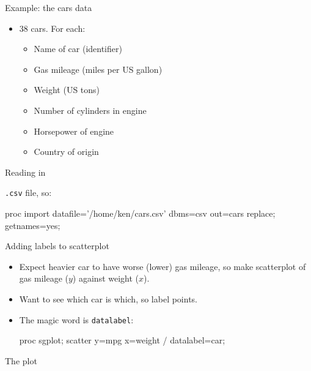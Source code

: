 \documentclass[unknownkeysallowed]{beamer}\usepackage[]{graphicx}\usepackage[]{color}
\begin{document}
\begin{frame}[fragile]{Example: the cars data}
  
  \begin{itemize}
  \item 38 cars. For each: 
    \begin{itemize}
    \item Name of car (identifier)
    \item Gas mileage (miles per US gallon)
    \item Weight (US tons)
    \item Number of cylinders in engine
    \item Horsepower of engine
    \item Country of origin
    \end{itemize}
  \end{itemize}
  
\end{frame}

\begin{frame}[fragile]{Reading in}
  
  \texttt{.csv} file, so:
  
    \begin{Datastep}
proc import 
  datafile='/home/ken/cars.csv'
  dbms=csv
  out=cars
  replace;
  getnames=yes;
    \end{Datastep}
  
  
\end{frame}

\begin{frame}[fragile]{Adding labels to scatterplot}
  
  \begin{itemize}
  \item Expect heavier car to have worse (lower) gas mileage, so make
    scatterplot of gas mileage ($y$) against weight ($x$).
  \item Want to see which car is which, so label points. 
  \item The magic word is \texttt{datalabel}:
    
    \begin{Sascode}[store=muggins]
proc sgplot;
  scatter y=mpg x=weight / datalabel=car;
    \end{Sascode}
  \end{itemize}
  
\end{frame}


\begin{frame}[fragile]{The plot}
  
  
\end{frame}
\end{document}
